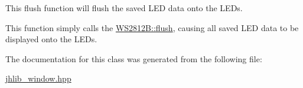 This flush function will flush the saved L\+ED data onto the L\+E\+Ds. 

This function simply calls the \hyperlink{classjhlib_1_1WS2812B_ac7a20c6eadaafa1449bada58669bc7c6}{W\+S2812\+B\+::flush}, causing all saved L\+ED data to be displayed onto the L\+E\+Ds. 

The documentation for this class was generated from the following file\+:\begin{DoxyCompactItemize}
\item 
\hyperlink{jhlib__window_8hpp}{jhlib\+\_\+window.\+hpp}\end{DoxyCompactItemize}
